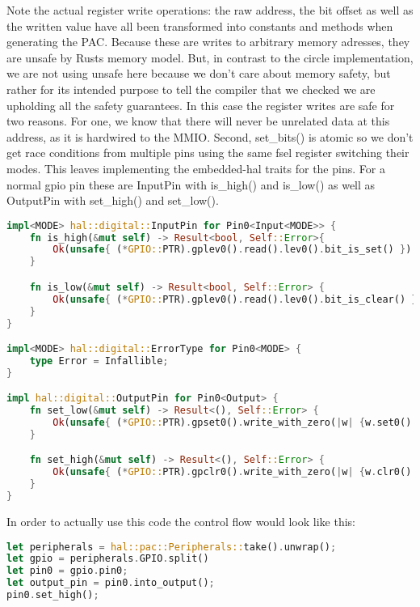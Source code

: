 Note the actual register write operations: the raw address,
the bit offset as well as the written value have all been transformed into constants and methods when generating the PAC.
Because these are writes to arbitrary memory adresses, they are unsafe by Rusts memory model.
But, in contrast to the circle implementation, we are not using unsafe here because we don't care about memory safety,
but rather for its intended purpose to tell the compiler that we checked we are upholding all the safety guarantees.
In this case the register writes are safe for two reasons.
For one, we know that there will never be unrelated data at this address, as it is hardwired to the MMIO.
Second, set\_bits() is atomic so we don't get race conditions from multiple pins using the same fsel register switching their modes.
This leaves implementing the embedded-hal traits for the pins. For a normal gpio pin these are InputPin with is\_high() and is\_low() as well as OutputPin with set\_high() and set\_low().

\begin{lstlisting}[language=Rust,style=colouredRust]
impl<MODE> hal::digital::InputPin for Pin0<Input<MODE>> {
    fn is_high(&mut self) -> Result<bool, Self::Error>{
        Ok(unsafe{ (*GPIO::PTR).gplev0().read().lev0().bit_is_set() })
    }

    fn is_low(&mut self) -> Result<bool, Self::Error> {
        Ok(unsafe{ (*GPIO::PTR).gplev0().read().lev0().bit_is_clear() })
    }
}

impl<MODE> hal::digital::ErrorType for Pin0<MODE> {
    type Error = Infallible;
}

impl hal::digital::OutputPin for Pin0<Output> {
    fn set_low(&mut self) -> Result<(), Self::Error> {
        Ok(unsafe{ (*GPIO::PTR).gpset0().write_with_zero(|w| {w.set0().set_bit()}) })
    }

    fn set_high(&mut self) -> Result<(), Self::Error> {
        Ok(unsafe{ (*GPIO::PTR).gpclr0().write_with_zero(|w| {w.clr0().clear_bit_by_one()}) })
    }
}
\end{lstlisting}

In order to actually use this code the control flow would look like this:

\begin{lstlisting}[language=Rust,style=colouredRust]
let peripherals = hal::pac::Peripherals::take().unwrap();
let gpio = peripherals.GPIO.split()
let pin0 = gpio.pin0;
let output_pin = pin0.into_output();
pin0.set_high();
\end{lstlisting}

